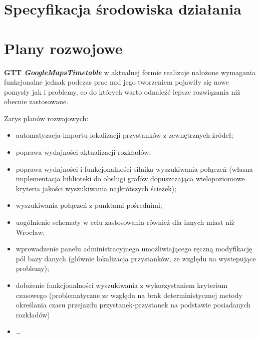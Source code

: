 \documentclass[a4paper,12pt]{article}
\begin{document}
\section{Specyfikacja środowiska działania}

\section{Plany rozwojowe} 

 \textbf{GTT \emph{GoogleMapsTimetable}} w aktualnej formie realizuje nałożone
 wymagania funkcjonalne jednak podczas prac nad jego tworzeniem pojawiły się
 nowe pomysły jak i problemy, co do których warto odnaleźć lepsze rozwiązania
 niż obecnie zastosowane.
 
 Zarys planów rozwojowych:
 
 \begin{itemize}
   \item automatyzacja importu lokalizacji przystanków z zewnętrznych źródeł;
   \item poprawa wydajności aktualizacji rozkładów;
   \item poprawa wydajności i funkcjonalności silnika wyszukiwania połączeń
   (własna implementacja biblioteki do obsługi grafów dopuszczająca
   wielopoziomowe kryteria jakości wyszukiwania najkrótszych ścieżek);
   \item wyszukiwania połączeń z punktami pośrednimi;
   \item uogólnienie schematy w celu zastosowania również dla innych miast niż
   Wrocław;
   \item wprowadzenie panelu administracyjnego umożliwiającego ręczną
   modyfikację pól bazy danych (głównie lokalizacja przystanków, ze względu na
   wystepujące problemy);
   \item dołożenie funkcjonalności wyszukiwania z wykorzystaniem
   kryterium czasowego (problematyczne ze względu na brak deterministycznej
   metody określania czasu przejazdu przystanek-przystanek na podstawie posiadanych rozkładów)
   \item \ldots
 \end{itemize}
\end{document}
